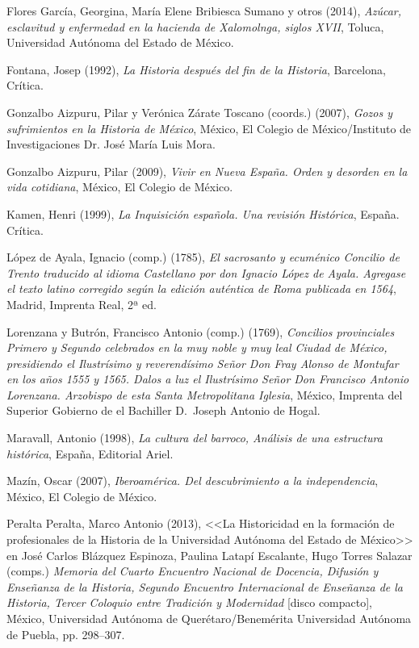 Flores García, Georgina, María Elene Bribiesca Sumano y otros (2014),
\textit{Azúcar, esclavitud y enfermedad en la hacienda de Xalomolnga, siglos
XVII}, Toluca, Universidad Autónoma del Estado de México.


Fontana, Josep (1992), \textit{La Historia después del fin de la Historia}, Barcelona, Crítica.


Gonzalbo Aizpuru, Pilar  y Verónica Zárate Toscano (coords.) (2007),
\textit{Gozos y sufrimientos en la Historia de México}, México, El Colegio de
México\slash{}Instituto de Investigaciones Dr. José María Luis Mora.


Gonzalbo Aizpuru, Pilar (2009), \textit{Vivir en Nueva España. Orden y desorden
en la vida cotidiana}, México, El Colegio de México.

Kamen, Henri (1999), \textit{La Inquisición española. Una revisión Histórica},
España. Crítica.


López de Ayala, Ignacio (comp.) (1785), \textit{El sacrosanto y ecuménico
Concilio de Trento traducido al idioma Castellano por don Ignacio López de
Ayala. Agregase el texto latino }\textit{corregido según la edición auténtica
de Roma publicada en 1564}, Madrid, Imprenta Real, 2ª ed.


Lorenzana y Butrón, Francisco Antonio (comp.) (1769), \textit{Concilios
provinciales Primero y Segundo celebrados en la muy noble y muy leal Ciudad de
México, presidiendo el Ilustrísimo y reverendísimo Señor Don Fray Alonso de
Montufar en los años 1555 y 1565. Dalos a luz el Ilustrísimo Señor Don
Francisco Antonio Lorenzana. Arzobispo de esta Santa Metropolitana Iglesia},
México, Imprenta del Superior Gobierno de el Bachiller D.~Joseph Antonio de
Hogal.


Maravall, Antonio (1998), \textit{La cultura del barroco, Análisis de una
estructura histórica}, España, Editorial Ariel.


Mazín, Oscar (2007), \textit{Iberoamérica. Del descubrimiento a la
independencia}, México, El Colegio de México.


Peralta Peralta, Marco Antonio (2013), <<La Historicidad en la formación de
profesionales de la Historia de la Universidad Autónoma del Estado de México>>
en José Carlos Blázquez Espinoza, Paulina Latapí Escalante, Hugo Torres Salazar
(comps.) \textit{Memoria del Cuarto Encuentro Nacional de Docencia, Difusión y
Enseñanza de la Historia, Segundo Encuentro Internacional de Enseñanza de la
Historia, Tercer Coloquio entre Tradición y Modernidad} [disco compacto],
México, Universidad Autónoma de Querétaro\slash{}Benemérita Universidad Autónoma de
Puebla, pp. 298--307. 
\newpage

